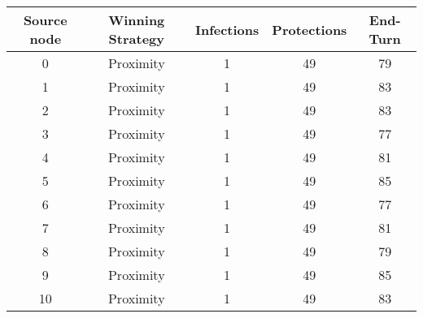\documentclass[results.tex]{subfiles}
\begin{document}
    \begin{center}
        \begin{tabular}{| c || c | c | c | c |}
            \hline
            {\bfseries Source node} & {\bfseries Winning Strategy} & {\bfseries Infections} & {\bfseries Protections}
            & {\bfseries End-Turn}
            \\  %
            \hline\hline
            0                       & Proximity                    & 1                      & 49                      & 79                   \\
            \hline
            1                       & Proximity                    & 1                      & 49                      & 83                   \\
            \hline
            2                       & Proximity                    & 1                      & 49                      & 83                   \\
            \hline
            3                       & Proximity                    & 1                      & 49                      & 77                   \\
            \hline
            4                       & Proximity                    & 1                      & 49                      & 81                   \\
            \hline
            5                       & Proximity                    & 1                      & 49                      & 85                   \\
            \hline
            6                       & Proximity                    & 1                      & 49                      & 77                   \\
            \hline
            7                       & Proximity                    & 1                      & 49                      & 81                   \\
            \hline
            8                       & Proximity                    & 1                      & 49                      & 79                   \\
            \hline
            9                       & Proximity                    & 1                      & 49                      & 85                   \\
            \hline
            10                      & Proximity                    & 1                      & 49                      & 83                   \\

\end{tabular}
\end{center}
\end{document}
